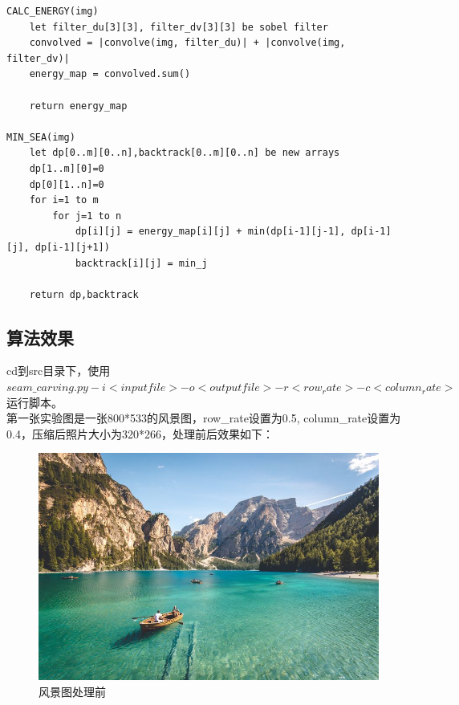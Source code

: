 \documentclass[UTF8]{ctexart}
\begin{document}
\begin{lstlisting}
CALC_ENERGY(img)
    let filter_du[3][3], filter_dv[3][3] be sobel filter
    convolved = |convolve(img, filter_du)| + |convolve(img, filter_dv)|
    energy_map = convolved.sum()

    return energy_map

MIN_SEA(img)
    let dp[0..m][0..n],backtrack[0..m][0..n] be new arrays
    dp[1..m][0]=0
    dp[0][1..n]=0
    for i=1 to m
        for j=1 to n
            dp[i][j] = energy_map[i][j] + min(dp[i-1][j-1], dp[i-1][j], dp[i-1][j+1])
            backtrack[i][j] = min_j
    
    return dp,backtrack
\end{lstlisting}

\subsection{算法效果}
cd到src目录下，使用 $seam\_carving.py -i <inputfile> -o <outputfile> -r <row_rate> -c <column_rate> $运行脚本。\\

第一张实验图是一张800*533的风景图，row\_rate设置为0.5, column\_rate设置为0.4，压缩后照片大小为320*266，处理前后效果如下：

\begin{figure}[H]
    \centering
    \includegraphics[width=1\textwidth]{img/input-1.jpg}
    \caption{风景图处理前}
    \label{input-1}
\end{figure}
\end{document}
